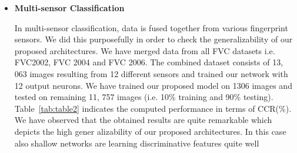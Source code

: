 \documentclass[12pt, a4paper,twoside]{article}
\begin{document}
	\begin{itemize}
		\item \textbf{Multi-sensor Classification}

		In multi-sensor classification, data is fused together from various fingerprint sensors. We did this purposefully in order to check the generalizability of our proposed architectures. We have merged data from all FVC datasets i.e. FVC2002, FVC 2004 and FVC 2006. The combined dataset consists of 13, 063 images resulting from 12 different sensors and trained our network with 12 output neurons. We have trained our proposed model on 1306 images and tested on remaining 11, 757 images (i.e. 10\% training and 90\% testing). Table~\ref{tab:table2} indicates the computed performance in terms of CCR(\%). We have observed that the obtained results are quite remarkable which depicts the high gener alizability of our proposed architectures. In this case also shallow networks are learning discriminative features quite well
	\end{itemize}
\end{document}
